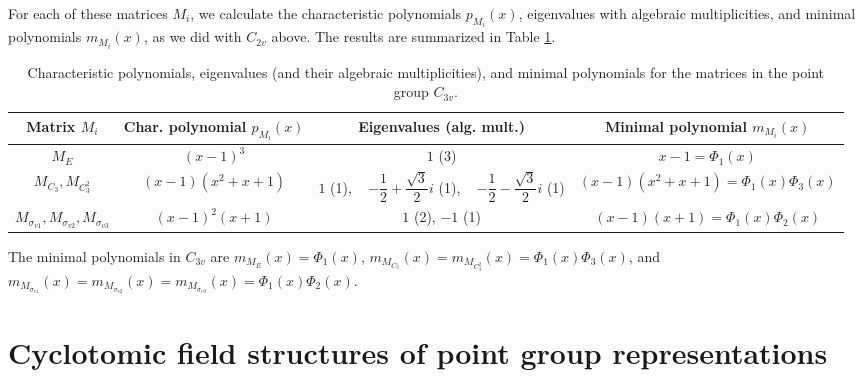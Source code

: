 \documentclass{article}
\begin{document}
    For each of these matrices $M_i$, we calculate the characteristic polynomials $p_{M_i}(x)$, eigenvalues with algebraic multiplicities, and minimal polynomials $m_{M_i}(x)$, as we did with $C_{2v}$ above. The results are summarized in Table \ref{tab:c3vpoly}.

    \begin{table}[htbp]
        \centering
        \renewcommand{\arraystretch}{3.5}
        \begin{tabular}{cccc}
            Matrix $M_i$ & Char. polynomial $p_{M_i}(x)$ & Eigenvalues (alg. mult.) & Minimal polynomial $m_{M_i}(x)$\\
            \hline
            $M_E$ & $(x-1)^3$ & $1$ (3) & $x-1=\Phi_1(x)$\\[5mm]
            $M_{C_3}, M_{C_3^2}$ & $(x-1)(x^2+x+1)$ & \parbox{3cm}{\centering $1$ (1),\\~\\ $-\dfrac12+\dfrac{\sqrt{3}}{2}i$ (1),\\~\\ $-\dfrac12-\dfrac{\sqrt{3}}{2}i$ (1)} & $(x-1)(x^2+x+1)=\Phi_1(x)\Phi_3(x)$\\[5mm]
            $M_{\sigma_{v1}}, M_{\sigma_{v2}}, M_{\sigma_{v3}}$ & $(x-1)^2(x+1)$ & $1$ (2), $-1$ (1) & $(x-1)(x+1)=\Phi_1(x)\Phi_2(x)$
        \end{tabular}
        \caption{Characteristic polynomials, eigenvalues (and their algebraic multiplicities), and minimal polynomials for the matrices in the point group $C_{3v}$.}
        \label{tab:c3vpoly}
    \end{table}

    The minimal polynomials in $C_{3v}$ are $m_{M_E}(x)=\Phi_1(x)$, $m_{M_{C_3}}(x)=m_{M_{C_3^2}}(x)=\Phi_1(x)\Phi_3(x)$, and $m_{M_{\sigma_{v1}}}(x)=m_{M_{\sigma_{v2}}}(x)=m_{M_{\sigma_{v3}}}(x)=\Phi_1(x)\Phi_2(x)$.

    \pagebreak

    \section{Cyclotomic field structures of point group representations}
\end{document}
